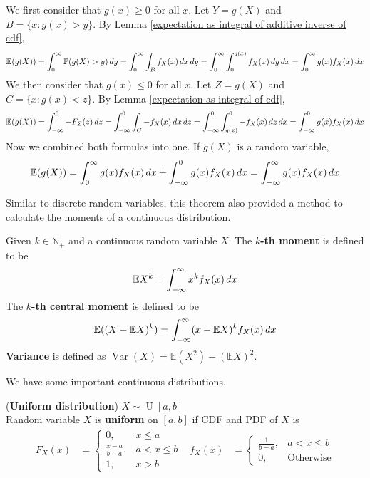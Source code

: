 \documentclass{huhtakm-template-book}
\newcommand{\prob}{\mathbb{P}}
\newcommand{\expect}{\mathbb{E}}
\DeclareMathOperator{\U}{U}
\DeclareMathOperator{\Var}{Var}
\begin{document}
    \newpage
    \begin{proofing}
        We first consider that $g(x)\geq 0$ for all $x$. Let $Y=g(X)$ and $B=\{x:g(x)>y\}$. By Lemma \ref{expectation as integral of additive inverse of cdf},
        \begin{equation*}
            \expect(g(X))=\intlu{0}{\infty}\prob(g(X)>y)\,dy=\intlu{0}{\infty}\int_{B}f_{X}(x)\,dx\,dy=\intlu{0}{\infty}\intlu{0}{g(x)}f_{X}(x)\,dy\,dx=\intlu{0}{\infty}g(x)f_{X}(x)\,dx
        \end{equation*}
        We then consider that $g(x)\leq 0$ for all $x$. Let $Z=g(X)$ and $C=\{x:g(x)<z\}$. By Lemma \ref{expectation as integral of cdf},
        \begin{equation*}
            \expect(g(X))=\intlu{-\infty}{0}-F_{Z}(z)\,dz=\intlu{-\infty}{0}\int_{C}-f_{X}(x)\,dx\,dz=\intlu{-\infty}{0}\intlu{g(x)}{0}-f_{X}(x)\,dz\,dx=\intlu{-\infty}{0}g(x)f_{X}(x)\,dx
        \end{equation*}
        Now we combined both formulas into one. If $g(X)$ is a random variable,
        \begin{equation*}
            \expect(g(X))=\int_{0}^{\infty}g(x)f_{X}(x)\,dx+\intlu{-\infty}{0}g(x)f_{X}(x)\,dx=\intinfty g(x)f_{X}(x)\,dx
        \end{equation*}
    \end{proofing}
    Similar to discrete random variables, this theorem also provided a method to calculate the moments of a continuous distribution.
    \begin{defn}
        Given $k\in\mathbb{N}_{+}$ and a continuous random variable $X$. The \textbf{$k$-th moment} is defined to be
        \begin{equation*}
            \expect X^{k}=\intinfty x^{k}f_{X}(x)\,dx
        \end{equation*}
        The \textbf{$k$-th central moment} is defined to be
        \begin{equation*}
            \expect((X-\expect X)^{k})=\intinfty(x-\expect X)^{k}f_{X}(x)\,dx
        \end{equation*}
        \textbf{Variance} is defined as $\Var(X)=\expect(X^{2})-(\expect X)^{2}$.
    \end{defn}
    We have some important continuous distributions.
    \begin{eg}(\textbf{Uniform distribution}) $X\sim\U[a,b]$\\
        Random variable $X$ is \textbf{uniform} on $[a,b]$ if CDF and PDF of $X$ is
        \begin{align*}
            F_{X}(x)&=\begin{cases}
                0, &x\leq a\\
                \frac{x-a}{b-a}, &a<x\leq b\\
                1, &x>b
            \end{cases} & f_{X}(x)&=\begin{cases}
                \frac{1}{b-a}, &a<x\leq b\\
                0, &\text{Otherwise}
            \end{cases}
        \end{align*}
    \end{eg}
\end{document}
